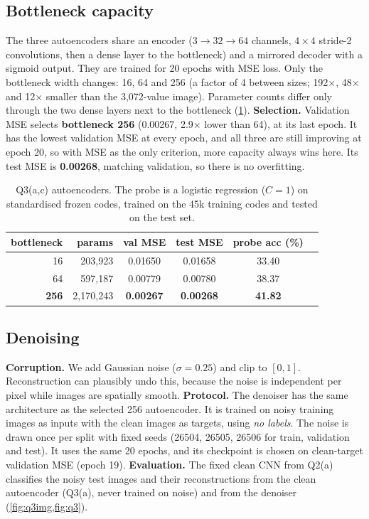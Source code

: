 \documentclass[10pt,twocolumn,letterpaper]{article}
\begin{document}
\subsection{Bottleneck capacity}
The three autoencoders share an encoder ($3{\to}32{\to}64$ channels, $4{\times}4$ stride-2 convolutions, then a dense layer to the bottleneck) and a mirrored decoder with a sigmoid output.
They are trained for 20 epochs with MSE loss.
Only the bottleneck width changes: 16, 64 and 256 (a factor of 4 between sizes; 192$\times$, 48$\times$ and 12$\times$ smaller than the 3,072-value image).
Parameter counts differ only through the two dense layers next to the bottleneck (\cref{tab:q3}).
\textbf{Selection.} Validation MSE selects \textbf{bottleneck 256} (0.00267, 2.9$\times$ lower than 64), at its last epoch.
It has the lowest validation MSE at every epoch, and all three are still improving at epoch 20, so with MSE as the only criterion, more capacity always wins here.
Its test MSE is \textbf{0.00268}, matching validation, so there is no overfitting.

\begin{table}[t]
\centering\footnotesize
\setlength{\tabcolsep}{4pt}
\begin{tabular}{@{}rrcccc@{}}
\toprule
bottleneck & params & val MSE & test MSE & probe acc (\%)\\
\midrule
16 & 203,923 & 0.01650 & 0.01658 & 33.40\\
64 & 597,187 & 0.00779 & 0.00780 & 38.37\\
\textbf{256} & 2,170,243 & \textbf{0.00267} & \textbf{0.00268} & \textbf{41.82}\\
\bottomrule
\end{tabular}
\caption{Q3(a,c) autoencoders. The probe is a logistic regression ($C{=}1$) on standardised frozen codes, trained on the 45k training codes and tested on the test set.}
\label{tab:q3}
\end{table}

\subsection{Denoising}
\textbf{Corruption.} We add Gaussian noise ($\sigma{=}0.25$) and clip to $[0,1]$.
Reconstruction can plausibly undo this, because the noise is independent per pixel while images are spatially smooth.
\textbf{Protocol.} The denoiser has the same architecture as the selected 256 autoencoder.
It is trained on noisy training images as inputs with the clean images as targets, using \emph{no labels}.
The noise is drawn once per split with fixed seeds (26504, 26505, 26506 for train, validation and test).
It uses the same 20 epochs, and its checkpoint is chosen on clean-target validation MSE (epoch 19).
\textbf{Evaluation.} The fixed clean CNN from Q2(a) classifies the noisy test images and their reconstructions from the clean autoencoder (Q3(a), never trained on noise) and from the denoiser (\cref{fig:q3img,fig:q3}).
\end{document}
